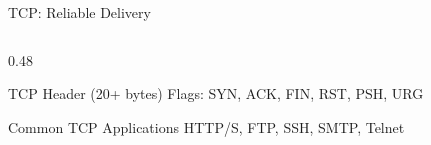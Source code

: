 \documentclass[aspectratio=169]{beamer}  %
\begin{document}
\begin{frame}{TCP: Reliable Delivery}
\begin{columns}[T]
\begin{column}{0.48\textwidth}
\begin{block}{TCP Header (20+ bytes)}
                \vspace{0.3em}
                \scriptsize
                \colorbox{aborange!30}{Flags}: SYN, ACK, FIN, RST, PSH, URG
            \end{block}
            
            \vspace{0.2em}
            \begin{block}{Common TCP Applications}
                \small
                HTTP/S, FTP, SSH, SMTP, Telnet
            \end{block}
        \end{column}
    \end{columns}
\end{frame}

\end{document}
